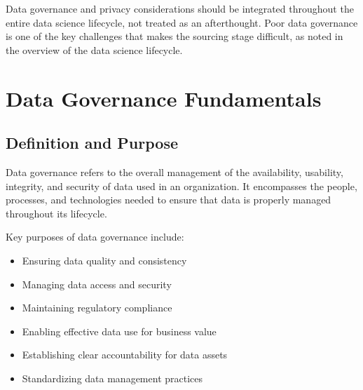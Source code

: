 \documentclass[12pt]{article}
\begin{document}
\begin{tcolorbox}[colback=yellow!5!white,colframe=yellow!75!black,title={Key Insight}]
Data governance and privacy considerations should be integrated throughout the entire data science lifecycle, not treated as an afterthought. Poor data governance is one of the key challenges that makes the sourcing stage difficult, as noted in the overview of the data science lifecycle.
\end{tcolorbox}

\section{Data Governance Fundamentals}

\subsection{Definition and Purpose}
\begin{tcolorbox}[colback=blue!5!white,colframe=blue!75!black,title={What is Data Governance?}]
Data governance refers to the overall management of the availability, usability, integrity, and security of data used in an organization. It encompasses the people, processes, and technologies needed to ensure that data is properly managed throughout its lifecycle.

Key purposes of data governance include:
\begin{itemize}
    \item Ensuring data quality and consistency
    \item Managing data access and security
    \item Maintaining regulatory compliance
    \item Enabling effective data use for business value
    \item Establishing clear accountability for data assets
    \item Standardizing data management practices
\end{itemize}
\end{tcolorbox}
\end{document}
